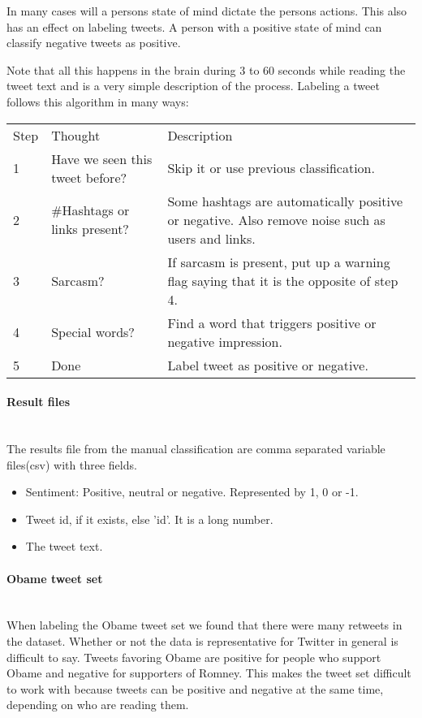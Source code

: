 In many cases will a persons state of mind dictate the persons actions. 
This also has an effect on labeling tweets. A person with a positive state of mind
can classify negative tweets as positive.

Note that all this happens in the brain during 3 to 60 seconds while reading
the tweet text and is a very simple description of the process.
Labeling a tweet follows this algorithm in many ways:

\begin{tabular}{ l p{3cm} p{6cm} }
Step & Thought & Description \\
1 & Have we seen this tweet before? & Skip it or use previous classification. \\
2 & \#Hashtags or links present? & Some hashtags are automatically positive or
negative. Also remove noise such as users and links.\\
3 & Sarcasm? & If sarcasm is present, put up a warning flag saying that it is
the opposite of step 4.\\
4 & Special words? & Find a word that triggers positive or negative
impression.\\
5 & Done & Label tweet as positive or negative.\\
\end{tabular}

\paragraph{Result files}
\hspace{0pt}\\
The results file from the manual classification are comma separated variable
files(csv) with three fields.
\begin{itemize}
    \item Sentiment: Positive, neutral or negative. Represented by 1, 0 or -1.
    \item Tweet id, if it exists, else 'id'. It is a long number.
    \item The tweet text.
\end{itemize}

\paragraph{Obame tweet set}
\hspace{0pt}\\
When labeling the Obame tweet set we found that there were many retweets in the
dataset. Whether or not the data is representative for Twitter in general is
difficult to say. Tweets favoring Obame are positive for people who support
Obame and negative for supporters of Romney. This makes the
tweet set difficult to work with because tweets can be positive and negative at
the same time, depending on who are reading them. 


